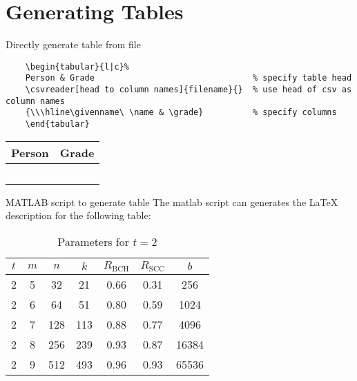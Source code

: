 \section{Generating Tables}

\begin{frame}[containsverbatim]{Directly generate table from file}
	\begin{verbatim}
	\begin{tabular}{l|c}%
	Person & Grade                                % specify table head
	\csvreader[head to column names]{filename}{}  % use head of csv as column names
	{\\\hline\givenname\ \name & \grade}          % specify columns 
	\end{tabular}
	\end{verbatim}
	 \begin{tabular}{l|c}%
		\bfseries Person & \bfseries Grade %
		\csvreader[head to column names]{figs/table.csv}{}%
		{\\\hline\givenname\ \name & \grade}%
	\end{tabular}
\end{frame}


\begin{frame}[containsverbatim]{MATLAB script to generate table}
 The matlab script 
can generates the LaTeX description for the following table:\\
\begin{table}[htbp]
	\centering
	\begin{tabular}{ccccccc}
		\hline
		
		\hline
		$t$ &  $m$ & $n$ & $k$ & $R_\text{BCH}$ & $R_\text{SCC}$ & $b$ \\ 
		\hline 
		2 & 5 & 32 & 21 & 0.66& 0.31 & 256 \\ 
		2 & 6 & 64 & 51 & 0.80& 0.59 & 1024 \\ 
		2 & 7 & 128 & 113 & 0.88& 0.77 & 4096 \\ 
		2 & 8 & 256 & 239 & 0.93& 0.87 & 16384 \\ 
		2 & 9 & 512 & 493 & 0.96& 0.93 & 65536 \\ 
		\hline

		\hline \end{tabular}
	\caption{Parameters for $t=2$} 
\end{table} 

\end{frame}

